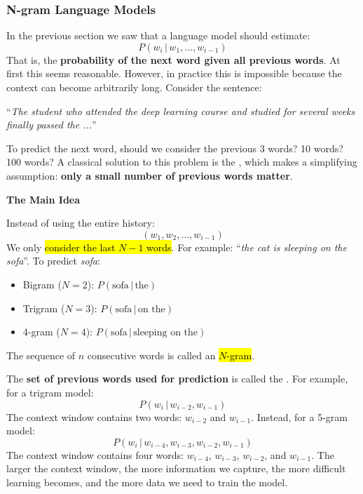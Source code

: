 \subsubsection{N-gram Language Models}\label{sec:n-gram-language-models}

In the previous section we saw that a language model should estimate:
\begin{equation*}
    P\left(w_i \, | \, w_{1}, \dots, w_{i-1}\right)
\end{equation*}
That is, the \textbf{probability of the next word given all previous words}. At first this seems reasonable. However, in practice this is impossible because the context can become arbitrarily long. Consider the sentence:
\begin{center}
    ``\emph{The student who attended the deep learning course and studied for several weeks finally passed the ...}''
\end{center}
To predict the next word, should we consider the previous 3 words? 10 words? 100 words? A classical solution to this problem is the , which makes a simplifying assumption: \textbf{only a small number of previous words matter}.

\highspace
\begin{flushleft}
    \textcolor{Green3}{ \textbf{The Main Idea}}
\end{flushleft}
Instead of using the entire history:
\begin{equation*}
    \left(w_1, w_2, \dots, w_{i-1}\right)
\end{equation*}
We only \hl{consider the last $N-1$ words}. For example: ``\emph{the cat is sleeping on the sofa}''. To predict \emph{sofa}:
\begin{itemize}
    \item Bigram ($N=2$): $P\left(\text{sofa} \, | \, \text{the}\right)$
    \item Trigram ($N=3$): $P\left(\text{sofa} \, | \, \text{on the}\right)$
    \item 4-gram ($N=4$): $P\left(\text{sofa} \, | \, \text{sleeping on the}\right)$
\end{itemize}
The sequence of $n$ consecutive words is called an \hl{$N$-gram}.

\highspace
The \textbf{set of previous words used for prediction} is called the . For example, for a trigram model:
\begin{equation*}
    P\left(w_i \, | \, w_{i-2}, w_{i-1}\right)
\end{equation*}
The context window contains two words: $w_{i-2}$ and $w_{i-1}$. Instead, for a 5-gram model:
\begin{equation*}
    P\left(w_i \, | \, w_{i-4}, w_{i-3}, w_{i-2}, w_{i-1}\right)
\end{equation*}
The context window contains four words: $w_{i-4}$, $w_{i-3}$, $w_{i-2}$, and $w_{i-1}$. The larger the context window, the more information we capture, the more difficult learning becomes, and the more data we need to train the model.

